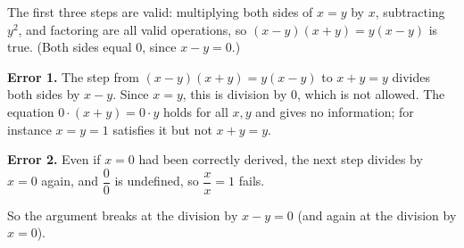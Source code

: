 The first three steps are valid: multiplying both sides of $x=y$ by $x$, subtracting $y^2$, and factoring are all valid operations, so $(x-y)(x+y)=y(x-y)$ is true. (Both sides equal $0$, since $x-y=0$.)

\textbf{Error 1.} The step from $(x-y)(x+y)=y(x-y)$ to $x+y=y$ divides both sides by $x-y$. Since $x=y$, this is division by $0$, which is not allowed. The equation $0\cdot(x+y)=0\cdot y$ holds for all $x,y$ and gives no information; for instance $x=y=1$ satisfies it but not $x+y=y$.

\textbf{Error 2.} Even if $x=0$ had been correctly derived, the next step divides by $x=0$ again, and $\dfrac{0}{0}$ is undefined, so $\dfrac {x}{x}=1$ fails.

So the argument breaks at $\boxed{\text{the division by } x-y=0}$ (and again at the division by $x=0$).

